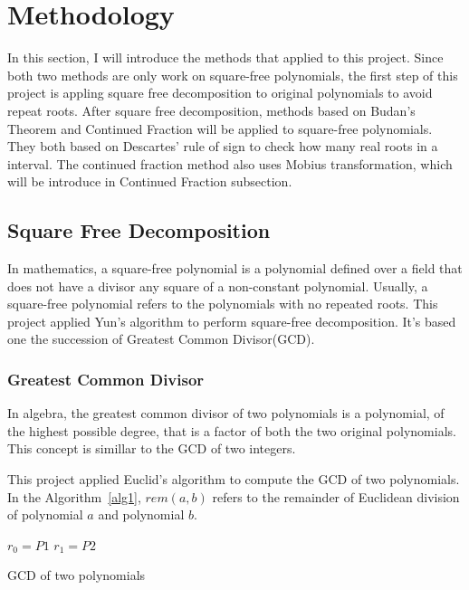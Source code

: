 \section{Methodology}

In this section, I will introduce the methods that applied to this project.
Since both two methods are only work on square-free polynomials, the first step
of this project is appling square free decomposition to original polynomials to
avoid repeat roots. After square free decomposition, methods based on Budan's
Theorem and Continued Fraction will be applied to square-free polynomials. They both based on
Descartes' rule of sign to check how many real roots in a interval. The continued fraction
method also uses Mobius transformation, which will be introduce in Continued Fraction
subsection.

\subsection{Square Free Decomposition} 
In mathematics, a square-free polynomial is a polynomial defined over a field
that does not have a divisor any square of a non-constant
polynomial\cite{Yuns}. Usually, a square-free polynomial refers to the
polynomials with no repeated roots. This project applied Yun's
algorithm\cite{Yuns} to perform square-free decomposition. It's based one the
succession of Greatest Common Divisor(GCD).

\subsubsection{Greatest Common Divisor}

In algebra, the greatest common divisor of two polynomials is a polynomial, 
of the highest possible degree, that is a factor of both the two original
polynomials. This concept is simillar to the GCD of two integers. 

This project applied Euclid's algorithm to compute the GCD of two polynomials.
In the Algorithm~\ref{alg1}, $rem(a,b)$ refers to the remainder of Euclidean division of
polynomial $a$ and polynomial $b$.

\begin{algorithm}[H]
\label{alg1}
\SetAlgoLined


  $r_0 = P1$\;
  $r_1 = P2$\;


\caption{GCD of two polynomials}
\end{algorithm}

